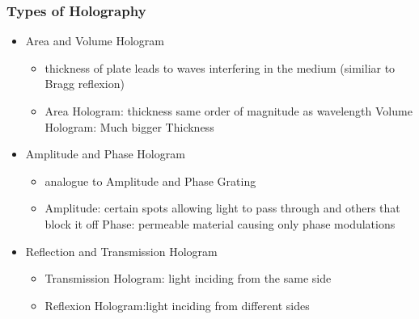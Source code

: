 \documentclass[10pt]{beamer}
\newcommand{\gra}[3][]{
	\begin{table}
	\centering
	\begin{tabular}[width=\textwidth]{c}
		\texttt{[image: ../figures/\#2.png]}\\
		\small #3
	\end{tabular}
	\end{table}
}
\begin{document}
\begin{frame}
	\frametitle{Types of Holography}
	\begin{itemize}
			\item Area and Volume Hologram
			\begin{itemize}
				\item thickness of plate leads to waves interfering in the medium (similiar to Bragg reflexion)
				\item Area Hologram: thickness same order of magnitude as wavelength Volume Hologram: Much bigger Thickness
			\end{itemize}
			\item Amplitude and Phase Hologram
			\begin{itemize}
				\item analogue to Amplitude and Phase Grating
				\item Amplitude: certain spots allowing light to pass through and others that block it off Phase: permeable material causing only phase modulations
			\end{itemize}
			\item Reflection and Transmission Hologram
			\begin{itemize}
			    \item Transmission Hologram: light inciding from the same side
			    \item Reflexion Hologram:light inciding from different sides
			\end{itemize}
	\end{itemize}
\end{frame}

\end{document}
